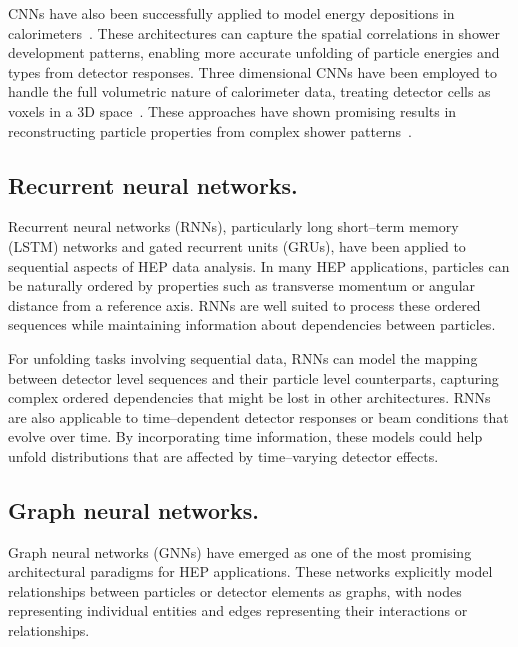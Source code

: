     CNNs have also been successfully applied to model energy depositions in calorimeters~\cite{bhattacherjee_study_2019}.
    These architectures can capture the spatial correlations in shower development patterns, enabling more accurate unfolding of particle energies and types from detector responses.
    Three dimensional CNNs have been employed to handle the full volumetric nature of calorimeter data, treating detector cells as voxels in a 3D space~\cite{yang_application_2024}.
    These approaches have shown promising results in reconstructing particle properties from complex shower patterns~\cite{noauthor_deep_nodate, shi_pointrcnn_2019}.
    
\subsection{Recurrent neural networks.}

    Recurrent neural networks (RNNs), particularly long short--term memory (LSTM) networks and gated recurrent units (GRUs), have been applied to sequential aspects of HEP data analysis.
    In many HEP applications, particles can be naturally ordered by properties such as transverse momentum or angular distance from a reference axis.
    RNNs are well suited to process these ordered sequences while maintaining information about dependencies between particles.

    For unfolding tasks involving sequential data, RNNs can model the mapping between detector level sequences and their particle level counterparts, capturing complex ordered dependencies that might be lost in other architectures.
    RNNs are also applicable to time--dependent detector responses or beam conditions that evolve over time.
    By incorporating time information, these models could help unfold distributions that are affected by time--varying detector effects.
    
\subsection{Graph neural networks.}
\label{subsec:deep-learning-architectures.gnns}

    Graph neural networks (GNNs) have emerged as one of the most promising architectural paradigms for HEP applications.
    These networks explicitly model relationships between particles or detector elements as graphs, with nodes representing individual entities and edges representing their interactions or relationships.

